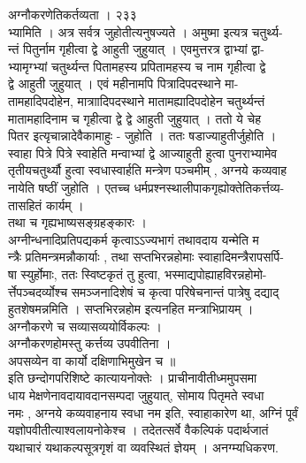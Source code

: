 \documentclass[11pt, openany]{book}
\begin{document}
{{{{{{{{{{{{{{{{{{{{{{{{{{{{{{{{{{{{{{{{{{{{{{{{{{{{{{{{{{{{{{{{{{{{{{{{{{{{{{{{{{{{{{{{{{{{{{{{{{{{{{{{{{{{{{{{{{{{{{{{{{{{{{{{{{{{{{{{ }{ अग्नौकरणेतिकर्तव्यता । २३३}{\\
भ्यामिति । अत्र सर्वत्र जुहोतीत्यनुषज्यते । अमुष्मा इत्यत्र चतुर्थ्य-\\
न्तं पितुर्नाम गृहीत्वा द्वे आहुती जुहुयात् । एवमुत्तरत्र द्वाभ्यां
द्वा-\\
भ्यामृग्भ्यां चतुर्थ्यन्त पितामहस्य प्रपितामहस्य च नाम गृहीत्वा द्वे\\
द्वे आहुती जुहुयात् । एवं महीनामपि पित्रादिपदस्थाने मा-\\
तामहादिपदोहेन, मात्राादिपदस्थाने मातामह्यादिपदोहेन चतुर्थ्यन्तं\\
मातामहादिनाम च गृहीत्वा द्वे द्वे आहुती जुहुयात् । ततो ये चेह\\
पितर इत्यृचान्नादेवैकामाहुः - जुहोति । ततः षडाज्याहुतीर्जुहोति ।\\
स्वाहा पित्रे पित्रे स्वाहेति मन्वाभ्यां द्वे आज्याहुती हुत्वा
पुनराभ्यामेव\\
तृतीयचतुर्थ्यौ हुत्वा स्वधास्वार्हति मन्त्रेण पञ्चमीम् , अग्नये
कव्यवाह\\
नायेति षष्ठीं जुहोति । एतच्च धर्मप्रश्नस्थालीपाकगृह्योक्तेतिकर्त्तव्य-\\
तासहितं कार्यम् ।\\
तथा च गृह्यभाष्यसङ्ग्रहङ्कारः ।\\
अग्नीन्धनादिप्रतिपद्यकर्म कृत्वाऽऽज्यभागं तथावदाय यन्मेति म\\
न्त्रैः प्रतिमन्त्रमन्नौकार्याः , तथा सप्तभिरन्नहोमाः
स्वाहादिमन्त्रैरापसर्पि-\\
षा स्युर्होमाः, ततः स्विष्टकृतं तु हुत्वा, भस्माद्यपोह्याहविरन्नहोमो-\\
र्त्तेपञ्चदर्व्योश्च समञ्जनादिशेषं च कृत्वा परिषेचनान्तं पात्रेषु
दद्याद्\\
हुतशेषमन्नमिति । सप्तभिरन्नहोम इत्यनहित मन्त्राभिप्रायम् ।\\
अग्नौकरणे च सव्यासव्ययोर्विकल्पः ।\\
अग्नौकरणहोमस्तु कर्त्तव्य उपवीतिना ।\\
अपसव्येन वा कार्यो दक्षिणाभिमुखेन च ॥\\
इति छन्दोगपरिशिष्टे कात्यायनोक्तेः । प्राचीनावीतीध्ममुपसमा\\
धाय मेक्षणेनावदायावदानसम्पदा जुहुयात्, सोमाय पितृमते स्वधा\\
नमः , अग्नये कव्यवाहनाय स्वधा नम इति, स्वाहाकारेण था, अग्निं पूर्वं\\
यज्ञोपवीतीत्याश्वलायनोकेश्च । तदेतत्सर्वे वैकल्पिकं पदार्थजातं\\
यथाचारं यथाकल्पसूत्रगृशं वा व्यवस्थितं ज्ञेयम् । अनग्म्यधिकरण.\\
}}}}}}}}}}}}}}}}}}}}}}}}}}}}}}}}}}}}}}}}}}}}}}}}}}}}}}}}}}}}}}}}}}}}}}}}}}}}}}}}}}}}}}}}}}}}}}}}}}}}}}}}}}}}}}}}}}}}}}}}}}}}}}}}}}}}}}}}
\end{document}
